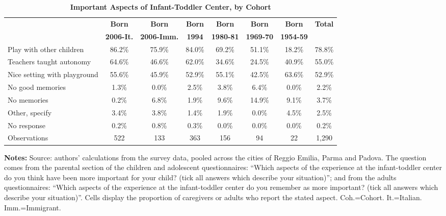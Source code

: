 \begin{table}[ht!]
\footnotesize
\caption{\textbf{Important Aspects of Infant-Toddler Center, by Cohort}}
\label{tab:SumImportantAsilo}
\begin{center}
 \tiny 
 \begin{tabular}{ l c c c c c c c }
\hline\hline
& \textbf{Born} & \textbf{Born} & \textbf{Born} & \textbf{Born} & \textbf{Born} & \textbf{Born} & \textbf{Total} \\
& \textbf{2006-It.} & \textbf{2006-Imm.} & \textbf{1994} & \textbf{1980-81} & \textbf{1969-70} & \textbf{1954-59} & \textbf{} \\
\hline
Play with other children     & 86.2\% & 75.9\% & 84.0\% & 69.2\% & 51.1\% & 18.2\% & 78.8\%\\[0.2em]
Teachers taught autonomy     & 64.6\% & 46.6\% & 62.0\% & 34.6\% & 24.5\% & 40.9\% & 55.0\%\\[0.2em]
Nice setting with playground & 55.6\% & 45.9\% & 52.9\% & 55.1\% & 42.5\% & 63.6\% & 52.9\%\\[0.2em]
No good memories             &  1.3\% &  0.0\% &  2.5\% &  3.8\% &  6.4\% &  0.0\% &  2.2\%\\[0.2em]
No memories                  &  0.2\% &  6.8\% &  1.9\% &  9.6\% & 14.9\% &  9.1\% &  3.7\%\\[0.2em]
Other, specify               &  3.4\% &  3.8\% &  1.4\% &  1.9\% &  0.0\% &  4.5\% &  2.5\%\\[0.2em]
No response                  &  0.2\% &  0.8\% &  0.3\% &  0.0\% &  0.0\% &  0.0\% &  0.2\%\\
\hline
Observations                 &   522 &   133 &   363 &   156 &    94 &    22 & 1,290 \\
\hline
\end{tabular}
\end{center} \begin{flushleft}
\tiny{{\bfseries Notes:} Source: authors' calculations from the survey data, pooled across the cities of Reggio Emilia, Parma and Padova. The question comes from the parental section of the children and adolescent questionnaires: ``Which aspects of the experience at the infant-toddler center do you think have been more important for your child? (tick all answers which describe your situation)''; and from the adults questionnaires: ``Which aspects of the experience at the infant-toddler center do you remember as more important? (tick all answers which describe your situation)''. Cells display the proportion of caregivers or adults who report the stated aspect. Coh.=Cohort. It.=Italian. Imm.=Immigrant.}
\end{flushleft} \end{table}
